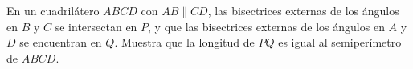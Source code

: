 En un cuadrilátero $ABCD$ con $AB \parallel CD$, las bisectrices externas de los ángulos en $B$ y $C$ se intersectan en $P$, y que las bisectrices externas de los ángulos en $A$ y $D$ se encuentran en $Q$. Muestra que la longitud de $PQ$ es igual al semiperímetro de $ABCD$. 